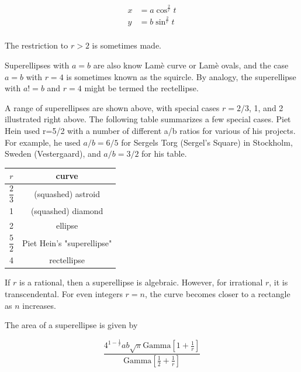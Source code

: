 \begin{align*}
x &= a \cos ^ {\frac{2}{r}} t \\
y &= b \sin ^ {\frac{2}{r}} t \\
\end{align*}

The restriction to $ r>2 $ is sometimes made.

Superellipses with $ a=b $ are also know Lam\`{e} curve or Lam\`{e} ovals, and the case $ a=b $ with $ r=4 $ is sometimes known as the squircle. By analogy, the superellipse with $ a!=b $ and $ r=4 $ might be termed the rectellipse.

A range of superellipses are shown above, with special cases $ r=2/3 $, 1, and 2 illustrated right above. The following table summarizes a few special cases. Piet Hein used r=5/2 with a number of different a/b ratios for various of his projects. For example, he used $ a/b=6/5 $ for Sergels Torg (Sergel's Square) in Stockholm, Sweden (Vestergaard), and $ a/b=3/2 $ for his table.

\begin{table}[!h]
	\centering
	\begin{tabular}{|c|c|}
		\hline 
		$ r $ & curve \\ 
		\hline 
		$ \dfrac{2}{3} $ & (squashed) astroid \\ 
		\hline 
		1 & (squashed) diamond \\ 
		\hline 
		2 & 	ellipse \\ 
		\hline 
		$ \dfrac{5}{2} $ & Piet Hein's "superellipse" \\ 
		\hline 
		4 & rectellipse \\ 
		\hline 
	\end{tabular} 
\end{table}

If $ r $ is a rational, then a superellipse is algebraic. However, for irrational $ r $, it is transcendental. For even integers $ r=n $, the curve becomes closer to a rectangle as $ n $ increases.

The area of a superellipse is given by

\begin{equation}
\frac{4^{1-\frac{1}{r}} a b \sqrt{\pi } \text{Gamma}\left[1+\frac{1}{r}\right]}{\text{Gamma}\left[\frac{1}{2}+\frac{1}{r}\right]}
\end{equation}

